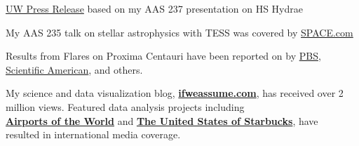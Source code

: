 \documentclass{article}
\begin{document}
\begin{llist}




\href{https://www.washington.edu/news/2021/01/14/hs-hydra/}{\color{blue}UW Press Release} based on my AAS 237 presentation on HS Hydrae

My AAS 235 talk on stellar astrophysics with TESS was covered by \href{https://www.space.com/tess-exoplanet-mission-studying-stars-too.html}{\color{blue}SPACE.com} 

Results from Flares on Proxima Centauri have been reported on by \href{http://www.pbs.org/newshour/rundown/earth-like-planet-orbits-suns-nearest-neighbor-every-11-days/}{\color{blue}PBS},
\href{https://www.scientificamerican.com/article/the-earth-next-door/}{\color{blue}Scientific American}, and others.

My science and data visualization blog, \href{http://www.ifweassume.com}{\color{blue}\bf{ifweassume.com}}, has received
over 2 million views. Featured data analysis projects including \\ \href{http://www.ifweassume.blogspot.com/2013/06/airports-of-world.html}{\color{blue}\bf{Airports of the World}} and \href{http://www.ifweassume.blogspot.com/2012/10/the-united-states-of-starbucks.html}{\color{blue}\bf{The United States of Starbucks}}, have\\ resulted in international media coverage.


\setlength{\topmargin}{-0.35in}


\end{llist}
\end{document}
